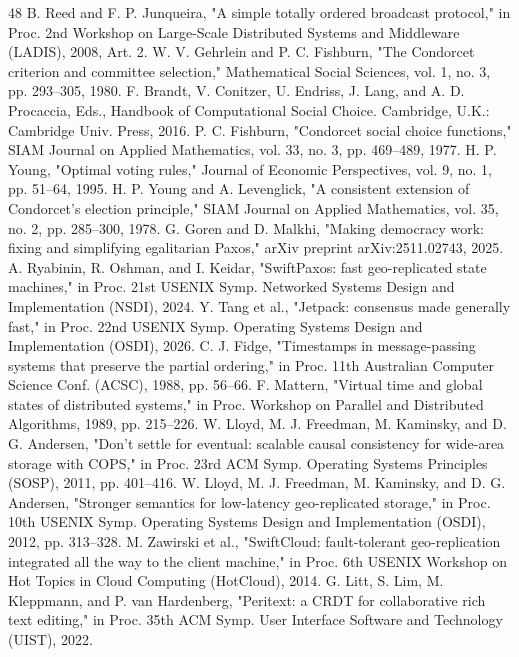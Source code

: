 \documentclass[journal]{IEEEtran}
\begin{document}
\begin{thebibliography}{48}
 B. Reed and F. P. Junqueira, "A simple totally ordered broadcast protocol," in Proc. 2nd Workshop on Large-Scale Distributed Systems and Middleware (LADIS), 2008, Art. 2.
 W. V. Gehrlein and P. C. Fishburn, "The Condorcet criterion and committee selection," Mathematical Social Sciences, vol. 1, no. 3, pp. 293–305, 1980.
 F. Brandt, V. Conitzer, U. Endriss, J. Lang, and A. D. Procaccia, Eds., Handbook of Computational Social Choice. Cambridge, U.K.: Cambridge Univ. Press, 2016.
 P. C. Fishburn, "Condorcet social choice functions," SIAM Journal on Applied Mathematics, vol. 33, no. 3, pp. 469–489, 1977.
 H. P. Young, "Optimal voting rules," Journal of Economic Perspectives, vol. 9, no. 1, pp. 51–64, 1995.
 H. P. Young and A. Levenglick, "A consistent extension of Condorcet's election principle," SIAM Journal on Applied Mathematics, vol. 35, no. 2, pp. 285–300, 1978.
 G. Goren and D. Malkhi, "Making democracy work: fixing and simplifying egalitarian Paxos," arXiv preprint arXiv:2511.02743, 2025.
 A. Ryabinin, R. Oshman, and I. Keidar, "SwiftPaxos: fast geo-replicated state machines," in Proc. 21st USENIX Symp. Networked Systems Design and Implementation (NSDI), 2024.
 Y. Tang et al., "Jetpack: consensus made generally fast," in Proc. 22nd USENIX Symp. Operating Systems Design and Implementation (OSDI), 2026.
 C. J. Fidge, "Timestamps in message-passing systems that preserve the partial ordering," in Proc. 11th Australian Computer Science Conf. (ACSC), 1988, pp. 56–66.
 F. Mattern, "Virtual time and global states of distributed systems," in Proc. Workshop on Parallel and Distributed Algorithms, 1989, pp. 215–226.
 W. Lloyd, M. J. Freedman, M. Kaminsky, and D. G. Andersen, "Don't settle for eventual: scalable causal consistency for wide-area storage with COPS," in Proc. 23rd ACM Symp. Operating Systems Principles (SOSP), 2011, pp. 401–416.
 W. Lloyd, M. J. Freedman, M. Kaminsky, and D. G. Andersen, "Stronger semantics for low-latency geo-replicated storage," in Proc. 10th USENIX Symp. Operating Systems Design and Implementation (OSDI), 2012, pp. 313–328.
 M. Zawirski et al., "SwiftCloud: fault-tolerant geo-replication integrated all the way to the client machine," in Proc. 6th USENIX Workshop on Hot Topics in Cloud Computing (HotCloud), 2014.
 G. Litt, S. Lim, M. Kleppmann, and P. van Hardenberg, "Peritext: a CRDT for collaborative rich text editing," in Proc. 35th ACM Symp. User Interface Software and Technology (UIST), 2022.

\end{thebibliography}
\end{document}
